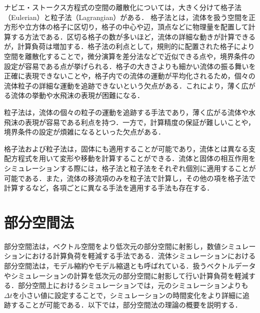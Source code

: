 \documentclass[a4j,12pt]{jreport}
\begin{document}
ナビエ・ストークス方程式の空間の離散化については，大きく分けて格子法（Eulerian）と粒子法（Lagrangian）がある．
格子法とは，流体を扱う空間を正方形や立方体の格子に区切り，格子の中心や辺，頂点などに物理量を配置して計算する方法である．区切る格子の数が多いほど，流体の詳細な動きが計算できるが，計算負荷は増加する．格子法の利点として，規則的に配置された格子により空間を離散化することで，微分演算を差分法などで近似できる点や，境界条件の設定が容易である点が挙げられる．格子の大きさよりも細かい流体の振る舞いを正確に表現できないことや，格子内での流体の運動が平均化されるため，個々の流体粒子の詳細な運動を追跡できないという欠点がある．これにより，薄く広がる流体の挙動や水飛沫の表現が困難になる．

粒子法は，流体の個々の粒子の運動を追跡する手法であり，薄く広がる流体や水飛沫の表現が容易である利点を持つ．一方で，計算精度の保証が難しいことや，境界条件の設定が煩雑になるといった欠点がある．

格子法および粒子法は，固体にも適用することが可能であり，流体とは異なる支配方程式を用いて変形や移動を計算することができる．流体と固体の相互作用をシミュレーションする際には，格子法と粒子法をそれぞれ個別に適用することが可能である．また，流体の移流項のみを粒子法で計算し，その他の項を格子法で計算するなど，各項ごとに異なる手法を適用する手法も存在する．


\section{部分空間法}\label{sec:Subspace}
部分空間法は，ベクトル空間をより低次元の部分空間に射影し，数値シミュレーションにおける計算負荷を軽減する手法である．流体シミュレーションにおける部分空間法は，モデル縮約やモデル縮退とも呼ばれている．扱うベクトルデータやシミュレーションの計算を低次元の部分空間に射影して行い計算負荷を軽減する．部分空間上におけるシミュレーションでは，元のシミュレーションよりも$\varDelta t$を小さい値に設定することで，シミュレーションの時間変化をより詳細に追跡することが可能である．以下では，部分空間法の理論の概要を説明する．
\end{document}
